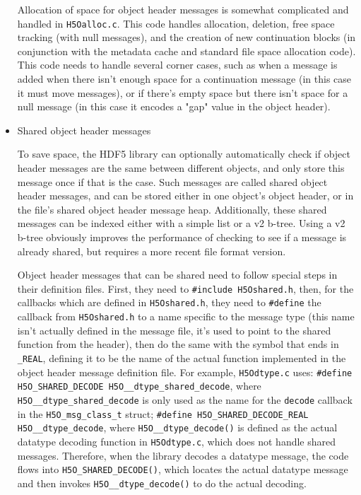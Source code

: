 \begin{itemize}
Allocation of space for object header messages is somewhat complicated and handled in \texttt{H5Oalloc.c}. This code handles allocation, deletion, free space tracking (with null messages), and the creation of new continuation blocks (in conjunction with the metadata cache and standard file space allocation code). This code needs to handle several corner cases, such as when a message is added when there isn't enough space for a continuation message (in this case it must move messages), or if there's empty space but there isn't space for a null message (in this case it encodes a "gap" value in the object header).

    \item Shared object header messages

To save space, the HDF5 library can optionally automatically check if object header messages are the same between different objects, and only store this message once if that is the case. Such messages are called shared object header messages, and can be stored either in one object's object header, or in the file's shared object header message heap. Additionally, these shared messages can be indexed either with a simple list or a v2 b-tree. Using a v2 b-tree obviously improves the performance of checking to see if a message is already shared, but requires a more recent file format version.

Object header messages that can be shared need to follow special steps in their definition files. First, they need to \texttt{\#include H5Oshared.h}, then, for the callbacks which are defined in \texttt{H5Oshared.h}, they need to \texttt{\#define} the callback from \texttt{H5Oshared.h} to a name specific to the message type (this name isn't actually defined in the message file, it's used to point to the shared function from the header), then do the same with the symbol that ends in \texttt{\_REAL}, defining it to be the name of the actual function implemented in the object header message definition file. For example, \texttt{H5Odtype.c} uses: \texttt{\#define H5O\_SHARED\_DECODE H5O\_\_dtype\_shared\_decode}, where \texttt{H5O\_\_dtype\_shared\_decode} is only used as the name for the \texttt{decode} callback in the \texttt{H5O\_msg\_class\_t} struct; \texttt{\#define H5O\_SHARED\_DECODE\_REAL H5O\_\_dtype\_decode}, where \texttt{H5O\_\_dtype\_decode()} is defined as the actual datatype decoding function in \texttt{H5Odtype.c}, which does not handle shared messages. Therefore, when the library decodes a datatype message, the code flows into \texttt{H5O\_SHARED\_DECODE()}, which locates the actual datatype message and then invokes \texttt{H5O\_\_dtype\_decode()} to do the actual decoding.


\end{itemize}
